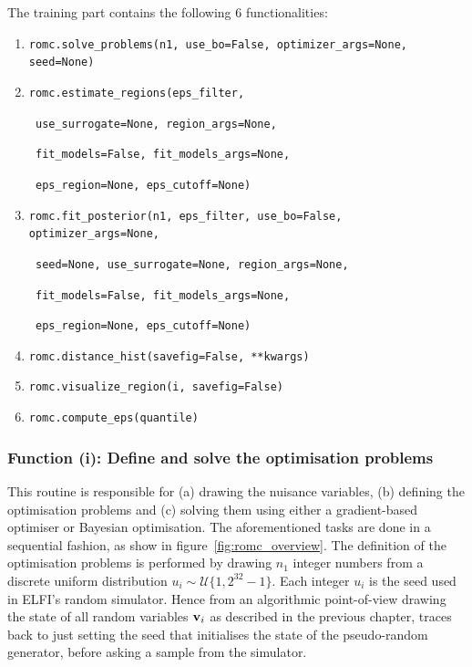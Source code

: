 The training part contains the following 6 functionalities:

\begin{enumerate}[label=(\roman*)]
\item \texttt{romc.solve_problems(n1, use_bo=False, optimizer_args=None, seed=None)}
\item \texttt{romc.estimate_regions(eps_filter,}
  
      \texttt{                      use_surrogate=None, region_args=None,}
  
      \texttt{                      fit_models=False, fit_models_args=None,}
  
      \texttt{                      eps_region=None, eps_cutoff=None)}
      
    \item \texttt{romc.fit_posterior(n1, eps_filter, use_bo=False, optimizer_args=None,}
  
          \texttt{                   seed=None, use_surrogate=None, region_args=None,}
  
          \texttt{                   fit_models=False, fit_models_args=None,}
  
          \texttt{                   eps_region=None, eps_cutoff=None)}

\item \texttt{romc.distance_hist(savefig=False, **kwargs)}
\item \texttt{romc.visualize_region(i, savefig=False)}
\item \texttt{romc.compute_eps(quantile)}
\end{enumerate}


\subsubsection*{Function (i): Define and solve the optimisation problems}

\vspace{5mm}

\noindent
This routine is responsible for (a) drawing the nuisance variables,
(b) defining the optimisation problems and (c) solving them using either a
gradient-based optimiser or Bayesian optimisation. The aforementioned
tasks are done in a sequential fashion, as show in
figure~\ref{fig:romc_overview}. The definition of the optimisation
problems is performed by drawing $n_1$ integer numbers from a discrete
uniform distribution $u_i \sim \mathcal{U}\{1, 2^{32}-1\}$. Each
integer $u_i$ is the seed used in ELFI's random simulator. Hence from
an algorithmic point-of-view drawing the state of all random
variables $\mathbf{v}_i$ as described in the previous chapter, traces back to
just setting the seed that initialises the state of the pseudo-random
generator, before asking a sample from the simulator.

